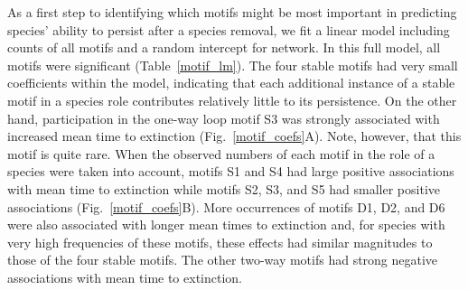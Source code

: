 \documentclass[12pt]{article}
\begin{document}
        As a first step to identifying which motifs might be most important in predicting species' ability to persist after a species removal, we fit a linear model including counts of all motifs and a random intercept for network.
		In this full model, all motifs were significant (Table~\ref{motif_lm}).
		The four stable motifs had very small coefficients within the model, indicating that each additional instance of a stable motif in a species role contributes relatively little to its persistence. 
		On the other hand, participation in the one-way loop motif S3 was strongly associated with increased mean time to extinction (Fig.~\ref{motif_coefs}A).
		Note, however, that this motif is quite rare. 
		When the observed numbers of each motif in the role of a species were taken into account, motifs S1 and S4 had large positive associations with mean time to extinction while motifs S2, 
		S3, and S5 had smaller positive associations (Fig.~\ref{motif_coefs}B).
		More occurrences of motifs D1, D2, and D6 were also associated with longer mean times to extinction and, for species with very high frequencies of these motifs, these effects had similar magnitudes to those of the four stable motifs.
		The other two-way motifs had strong negative associations with mean time to extinction.
		
\end{document}
